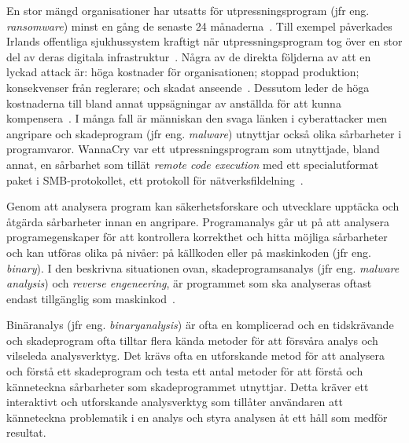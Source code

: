 En stor mängd organisationer har utsatts för utpressningsprogram (jfr eng.
\emph{ransomware}) minst en gång de senaste 24 månaderna~\cite{cyberreason2021,
    cyberreason2022}. Till exempel påverkades Irlands offentliga sjukhussystem
kraftigt när utpressningsprogram tog över en stor del av deras digitala
infrastruktur~\cite{hse_report, gallagher2023}.  Några av de direkta följderna
av att en lyckad attack är: höga kostnader för organisationen; stoppad
produktion; konsekvenser från reglerare; och skadat
anseende~\cite{cyberreason2021, cyberreason2022}. Dessutom leder de höga
kostnaderna till bland annat uppsägningar av anställda för att kunna
kompensera~\cite{cyberreason2021, cyberreason2022}. I många fall är människan
den svaga länken i cyberattacker men angripare och skadeprogram (jfr eng.
\emph{malware}) utnyttjar också olika sårbarheter i programvaror. WannaCry var
ett utpressningsprogram som utnyttjade, bland annat, en sårbarhet som tillät
\emph{remote code execution} med ett specialutformat paket i SMB-protokollet,
ett protokoll för nätverksfildelning~\cite{alraddadicomprehensive}.


Genom att analysera program kan säkerhetsforskare och utvecklare upptäcka och
åtgärda sårbarheter innan en angripare. Programanalys går ut på att analysera
programegenskaper för att kontrollera korrekthet och hitta möjliga sårbarheter
och kan utföras olika på nivåer: på källkoden eller på maskinkoden (jfr eng.
\emph{binary}). I den beskrivna situationen ovan, skadeprogramsanalys (jfr eng.
\emph{malware analysis}) och \emph{reverse engeneering}, är programmet som ska
analyseras oftast endast tillgänglig som maskinkod~\cite{andriesse2018}.

Binäranalys (jfr eng. \emph{binaryanalysis}) är ofta en komplicerad och en
tidskrävande och skadeprogram ofta tilltar flera kända metoder för att försvåra
analys och vilseleda analysverktyg. Det krävs ofta en utforskande metod för att
analysera och förstå ett skadeprogram och testa ett antal metoder för att förstå
och känneteckna sårbarheter som skadeprogrammet utnyttjar. Detta kräver ett
interaktivt och utforskande analysverktyg som tillåter användaren att
känneteckna problematik i en analys och styra analysen åt ett håll som medför
resultat.

